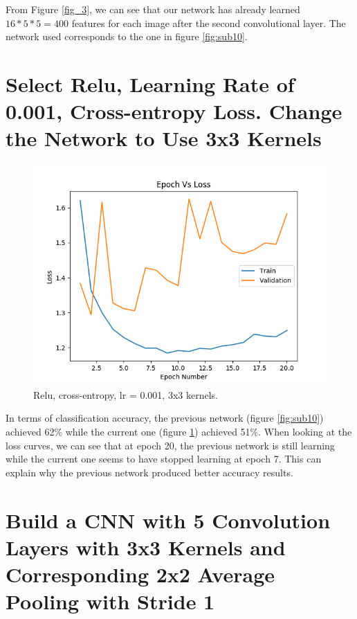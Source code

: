 \documentclass[12pt]{article}
\begin{document}
		From Figure \ref{fig_3}, we can see that our network has already learned $16*5*5 = 400$ features for each image after the second convolutional layer. The network used corresponds to the one in figure \ref{fig:sub10}.
		
		\newpage
		\section{Select Relu, Learning Rate of 0.001, Cross-entropy Loss. Change the Network to Use 3x3 Kernels}
			\begin{figure}[h]
				\centering
				\begin{framed}
					\centering
					\includegraphics[width=12cm]{../Images/Epoch_VS_Loss/ReLU_cross-entropy_01.png}
					\captionsetup{justification=centering,margin=1cm}
				\end{framed}
					\caption{Relu, cross-entropy, lr = 0.001, 3x3 kernels.}
					\label{Fig_4}
			\end{figure}
		
			In terms of classification accuracy, the previous network (figure \ref{fig:sub10}) achieved 62\% while the current one (figure \ref{Fig_4}) achieved 51\%. When looking at the loss curves, we can see that at epoch 20, the previous network is still learning while the current one seems to have stopped learning at epoch 7. This can explain why the previous network produced better accuracy results.
		
		\newpage
		\section{Build a CNN with 5 Convolution Layers with 3x3 Kernels and Corresponding 2x2 Average Pooling with Stride 1}
\end{document}
